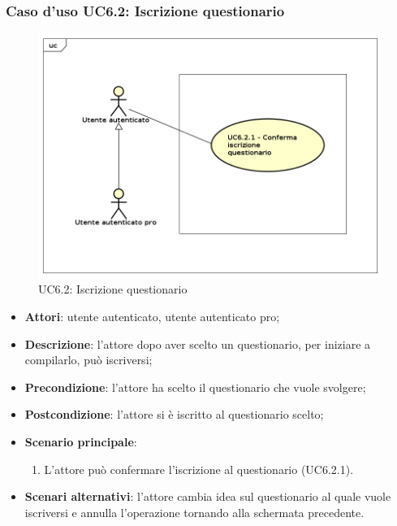 \subsubsection{Caso d'uso UC6.2: Iscrizione questionario}
\label{UC6.2}
\begin{figure}[h]
\centering
\includegraphics[scale=0.5,keepaspectratio]{UML/UC6_2.png}
\caption{UC6.2: Iscrizione questionario}
\end{figure}
\FloatBarrier
\begin{itemize}
\item\textbf{Attori}: utente autenticato, utente autenticato pro;
\item\textbf{Descrizione}: l'attore dopo aver scelto un questionario, per iniziare a compilarlo, può iscriversi;
\item\textbf{Precondizione}: l'attore ha scelto il questionario che vuole svolgere;
\item\textbf{Postcondizione}: l'attore si è iscritto al questionario scelto;
\item\textbf{Scenario principale}: 
\begin{enumerate}
\item L'attore può confermare l'iscrizione al questionario (UC6.2.1).
\end{enumerate}
\item\textbf{Scenari alternativi}: l'attore cambia idea sul questionario al quale vuole iscriversi e annulla l'operazione tornando alla schermata precedente.
\end{itemize}

